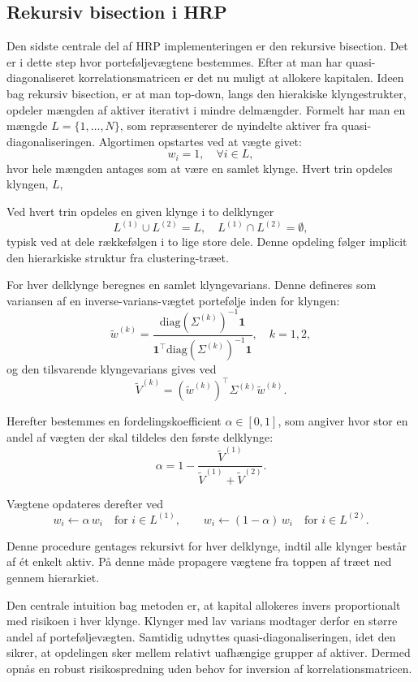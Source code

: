 \documentclass[../main.tex]{subfiles}
\begin{document}
\subsection{Rekursiv bisection i HRP}

Den sidste centrale del af HRP implementeringen er den rekursive bisection. Det er i dette step hvor porteføljevægtene bestemmes. Efter at man har quasi-diagonaliseret korrelationsmatricen er det nu muligt at allokere kapitalen. Ideen bag rekursiv bisection, er at man top-down, langs den hierakiske klyngestrukter, opdeler mængden af aktiver iterativt i mindre delmængder. Formelt har man en mængde $L = \{1, \dots, N\}$, som repræsenterer de nyindelte aktiver fra quasi-diagonaliseringen. Algortimen opstartes ved at vægte givet:
\[
w_i = 1, \quad \forall i \in L,
\]
hvor hele mængden antages som at være en samlet klynge. Hvert trin opdeles klyngen, $L$,



Ved hvert trin opdeles en given klynge  i to delklynger
\[
L^{(1)} \cup L^{(2)} = L, \quad L^{(1)} \cap L^{(2)} = \emptyset,
\]
typisk ved at dele rækkefølgen i to lige store dele. Denne opdeling følger implicit den hierarkiske struktur fra clustering-træet.

For hver delklynge beregnes en samlet klyngevarians. Denne defineres som variansen af en inverse-varians-vægtet portefølje inden for klyngen:
\[
\tilde{w}^{(k)} = \frac{\mathrm{diag}(\Sigma^{(k)})^{-1} \mathbf{1}}{\mathbf{1}^\top \mathrm{diag}(\Sigma^{(k)})^{-1} \mathbf{1}}, \quad k = 1,2,
\]
og den tilsvarende klyngevarians gives ved
\[
\tilde{V}^{(k)} = (\tilde{w}^{(k)})^\top \Sigma^{(k)} \tilde{w}^{(k)}.
\]

Herefter bestemmes en fordelingskoefficient $\alpha \in [0,1]$, som angiver hvor stor en andel af vægten der skal tildeles den første delklynge:
\[
\alpha = 1 - \frac{\tilde{V}^{(1)}}{\tilde{V}^{(1)} + \tilde{V}^{(2)}}.
\]

Vægtene opdateres derefter ved
\[
w_i \leftarrow \alpha \, w_i \quad \text{for } i \in L^{(1)}, \qquad
w_i \leftarrow (1-\alpha) \, w_i \quad \text{for } i \in L^{(2)}.
\]

Denne procedure gentages rekursivt for hver delklynge, indtil alle klynger består af ét enkelt aktiv. På denne måde propagere vægtene fra toppen af træet ned gennem hierarkiet.

Den centrale intuition bag metoden er, at kapital allokeres invers proportionalt med risikoen i hver klynge. Klynger med lav varians modtager derfor en større andel af porteføljevægten. Samtidig udnyttes quasi-diagonaliseringen, idet den sikrer, at opdelingen sker mellem relativt uafhængige grupper af aktiver. Dermed opnås en robust risikospredning uden behov for inversion af korrelationsmatricen.
\end{document}
